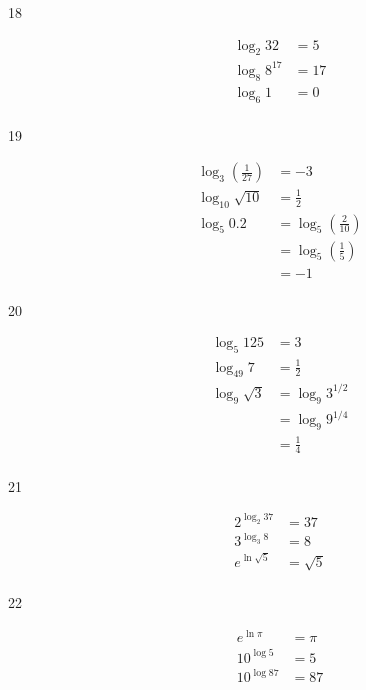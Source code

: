 \documentclass{exam}
\begin{document}
\begin{description}
    \item[18]
      \begin{align*}
        \log_2 32     &= 5 \\
        \log_8 8^{17} &= 17 \\
        \log_6 1      &= 0 \\
      \end{align*}

    \item[19]
      \begin{align*}
        \log_3 \left( \frac{1}{27} \right) &= -3 \\
        \log_{10} \sqrt{10}                &= \frac{1}{2} \\
        \log_5 0.2                         &= \log_5 \left( \frac{2}{10} \right) \\
                                           &= \log_5 \left( \frac{1}{5} \right) \\
                                           &= -1 \\
      \end{align*}

    \item[20]
      \begin{align*}
        \log_5 125      &= 3 \\
        \log_{49} 7     &= \frac{1}{2} \\
        \log_9 \sqrt{3} &= \log_9 3^{1/2} \\
                        &= \log_9 9^{1/4} \\
                        &= \frac{1}{4} \\
      \end{align*}

    \item[21]
      \begin{align*}
        2^{\log_2 37}    &= 37 \\
        3^{\log_3 8}     &= 8 \\
        e^{\ln \sqrt{5}} &= \sqrt{5} \\
      \end{align*}

    \item[22]
      \begin{align*}
        e^{\ln \pi}  &= \pi \\
        10^{\log 5}  &= 5 \\
        10^{\log 87} &= 87 \\
      \end{align*}


\end{description}
\end{document}
